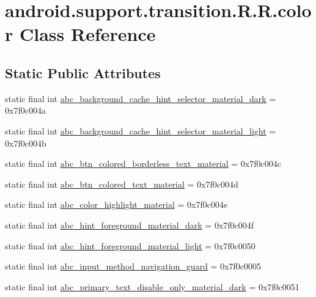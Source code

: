 \hypertarget{classandroid_1_1support_1_1transition_1_1_r_1_1color}{
\section{android.support.transition.R.R.color Class Reference}
\label{classandroid_1_1support_1_1transition_1_1_r_1_1color}
}
\subsection*{Static Public Attributes}
\begin{CompactItemize}
\item 
static final int \hyperlink{classandroid_1_1support_1_1transition_1_1_r_1_1color_5b20b0929f2fe9f8a03f52a4a0efce34}{abc\_\-background\_\-cache\_\-hint\_\-selector\_\-material\_\-dark} = 0x7f0c004a
\item 
static final int \hyperlink{classandroid_1_1support_1_1transition_1_1_r_1_1color_d3b03f017263b232201c00f9fd35c656}{abc\_\-background\_\-cache\_\-hint\_\-selector\_\-material\_\-light} = 0x7f0c004b
\item 
static final int \hyperlink{classandroid_1_1support_1_1transition_1_1_r_1_1color_73eeb19164559002ff2b61779bd57795}{abc\_\-btn\_\-colored\_\-borderless\_\-text\_\-material} = 0x7f0c004c
\item 
static final int \hyperlink{classandroid_1_1support_1_1transition_1_1_r_1_1color_1b20045db56fed17b75ec40d08d3142c}{abc\_\-btn\_\-colored\_\-text\_\-material} = 0x7f0c004d
\item 
static final int \hyperlink{classandroid_1_1support_1_1transition_1_1_r_1_1color_7a5d8fe7c2de9abe94b9a8da447907d9}{abc\_\-color\_\-highlight\_\-material} = 0x7f0c004e
\item 
static final int \hyperlink{classandroid_1_1support_1_1transition_1_1_r_1_1color_7de921ba0981e970147ac50b3b6b04bc}{abc\_\-hint\_\-foreground\_\-material\_\-dark} = 0x7f0c004f
\item 
static final int \hyperlink{classandroid_1_1support_1_1transition_1_1_r_1_1color_7993dceece834564ac3ed32eb02dcb8b}{abc\_\-hint\_\-foreground\_\-material\_\-light} = 0x7f0c0050
\item 
static final int \hyperlink{classandroid_1_1support_1_1transition_1_1_r_1_1color_cf450c1548fff4bb108e8d16373d9ead}{abc\_\-input\_\-method\_\-navigation\_\-guard} = 0x7f0c0005
\item 
static final int \hyperlink{classandroid_1_1support_1_1transition_1_1_r_1_1color_1f698232f172b8f0558a2a51dd5fcdb1}{abc\_\-primary\_\-text\_\-disable\_\-only\_\-material\_\-dark} = 0x7f0c0051

\end{CompactItemize}
